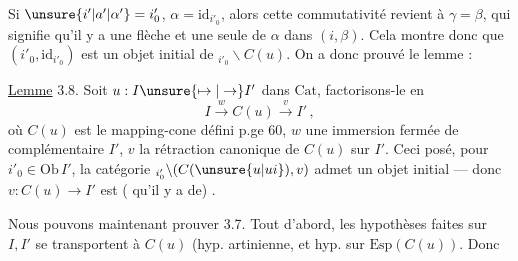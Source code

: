 
Si $\unsure{i'|a'|\alpha'}=i'_0$, $\alpha=\mathrm{id}_{i'_0}$, alors cette commutativité
revient à $\gamma=\beta$,  qui signifie qu'il
y a une flèche et une seule de
$\alpha$ dans $(i,\beta)$. Cela montre donc que
$(i'_0,\mathrm{id}_{i'_0})$ est un objet initial de $\mathord{}_{i'_0}\backslash C(u)$.
On a donc prouvé le lemme :

\uline{Lemme} 3.8. Soit \unsure{--} $u:I\unsure{\mapsto|\to} I'$ 
dans $\mathrm{Cat}$, factorisons-le en
\[
I\xrightarrow{w} C(u)\xrightarrow{v}I'\,,
\]
où $C(u)$ est le mapping-cone défini
p.ge 60, $w$ une immersion fermée
de complémentaire $I'$, $v$ la rétraction
canonique de $C(u)$ sur $I'$. Ceci
posé, pour  $i'_0\in\mathrm{Ob}\, I'$, la catégorie
$\mathord{}_{i'_0}\backslash(C(\unsure{u|ui}),v)$ admet un objet initial ---
donc $v:C(u)\longrightarrow I'$ est ( qu'il
y a de) .

Nous pouvons maintenant prouver
3.7. Tout d'abord, les hypothèses
faites sur $I,I'$ se transportent à
$C(u)$ (hyp. artinienne, et 
hyp.  sur $\mathrm{Esp}(C(u))$. Donc
